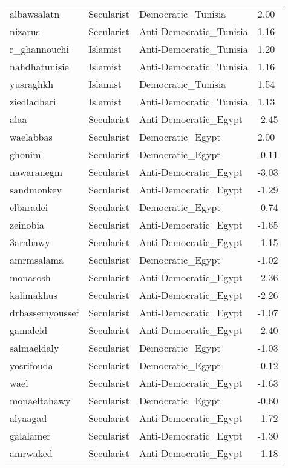 \begin{longtable}{llll}
  albawsalatn & Secularist & Democratic\_Tunisia & 2.00 \\ 
  nizarus & Secularist & Anti-Democratic\_Tunisia & 1.16 \\ 
  r\_ghannouchi & Islamist & Anti-Democratic\_Tunisia & 1.20 \\ 
  nahdhatunisie & Islamist & Anti-Democratic\_Tunisia & 1.16 \\ 
  yusraghkh & Islamist & Democratic\_Tunisia & 1.54 \\ 
  ziedladhari & Islamist & Anti-Democratic\_Tunisia & 1.13 \\ 
  alaa & Secularist & Anti-Democratic\_Egypt & -2.45 \\ 
  waelabbas & Secularist & Democratic\_Egypt & 2.00 \\ 
  ghonim & Secularist & Democratic\_Egypt & -0.11 \\ 
  nawaranegm & Secularist & Anti-Democratic\_Egypt & -3.03 \\ 
  sandmonkey & Secularist & Anti-Democratic\_Egypt & -1.29 \\ 
  elbaradei & Secularist & Democratic\_Egypt & -0.74 \\ 
  zeinobia & Secularist & Anti-Democratic\_Egypt & -1.65 \\ 
  3arabawy & Secularist & Anti-Democratic\_Egypt & -1.15 \\ 
  amrmsalama & Secularist & Democratic\_Egypt & -1.02 \\ 
  monasosh & Secularist & Anti-Democratic\_Egypt & -2.36 \\ 
  kalimakhus & Secularist & Anti-Democratic\_Egypt & -2.26 \\ 
  drbassemyoussef & Secularist & Anti-Democratic\_Egypt & -1.07 \\ 
  gamaleid & Secularist & Anti-Democratic\_Egypt & -2.40 \\ 
  salmaeldaly & Secularist & Democratic\_Egypt & -1.03 \\ 
  yosrifouda & Secularist & Democratic\_Egypt & -0.12 \\ 
  wael & Secularist & Anti-Democratic\_Egypt & -1.63 \\ 
  monaeltahawy & Secularist & Democratic\_Egypt & -0.60 \\ 
  alyaagad & Secularist & Anti-Democratic\_Egypt & -1.72 \\ 
  galalamer & Secularist & Anti-Democratic\_Egypt & -1.30 \\ 
  amrwaked & Secularist & Anti-Democratic\_Egypt & -1.18 \\ 

\end{longtable}
